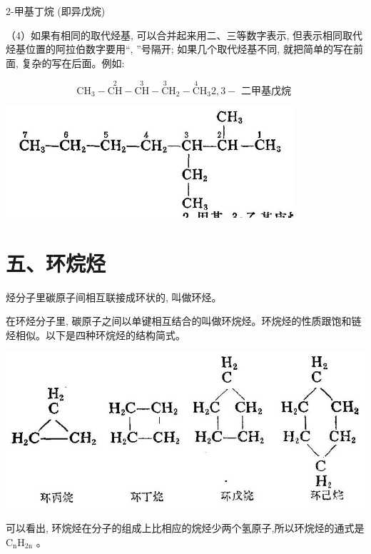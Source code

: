 \documentclass[10pt]{article}
\begin{document}
2-甲基丁烷 (即异戊烷)

（4）如果有相同的取代烃基, 可以合并起来用二、三等数字表示, 但表示相同取代烃基位置的阿拉伯数字要用“, ”号隔开; 如果几个取代烃基不同, 就把简单的写在前面, 复杂的写在后面。例如:

\[
{\mathrm{{CH}}}_{3} - \overset{2}{\mathrm{{CH}}} - \overset{3}{\mathrm{{CH}}} - \overset{3}{\mathrm{C}}{\mathrm{H}}_{2} - \overset{4}{\mathrm{C}}{\mathrm{H}}_{3}2,3 - \text{ 二甲基戊烷 }
\]

\begin{center}
\includegraphics[max width=0.8\textwidth]{images/01912d16-be99-77bb-9535-4f3ed8d9946f_65_854565.jpg}
\end{center}

\section*{五、环烷烃}

烃分子里碳原子间相互联接成环状的, 叫做环烃。

在环烃分子里, 碳原子之间以单键相互结合的叫做环烷烃。环烷烃的性质跟饱和链烃相似。以下是四种环烷烃的结构简式。

\begin{center}
\includegraphics[max width=1.0\textwidth]{images/01912d16-be99-77bb-9535-4f3ed8d9946f_65_980531.jpg}
\end{center}

可以看出, 环烷烃在分子的组成上比相应的烷烃少两个氢原子,所以环烷烃的通式是 \({\mathrm{C}}_{\mathrm{n}}{\mathrm{H}}_{2\mathrm{n}}\) 。
\end{document}
